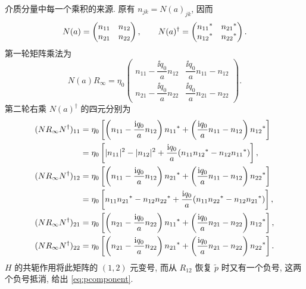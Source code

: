 \par\smallskip\noindent 介质分量中每一个乘积的来源.\quad
原有 $n_{jk}=N(a)_{jk}$, 因而
\begin{equation*}
N(a)=\begin{pmatrix}n_{11}&n_{12}\\n_{21}&n_{22}\end{pmatrix},\qquad
N(a)^\dagger=
\begin{pmatrix}{n_{11}}^{*}&{n_{21}}^{*}\\
{n_{12}}^{*}&{n_{22}}^{*}\end{pmatrix}.
\end{equation*}
第一轮矩阵乘法为
\begin{equation*}
N(a)R_\infty
=\eta_0\begin{pmatrix}
n_{11}-\dfrac{\ii q_0}{a}n_{12}
&\dfrac{\ii q_0}{a}n_{11}-n_{12}\\
n_{21}-\dfrac{\ii q_0}{a}n_{22}
&\dfrac{\ii q_0}{a}n_{21}-n_{22}
\end{pmatrix}.
\end{equation*}
第二轮右乘 $N(a)^\dagger$ 的四元分别为
\begin{equation*}
\begin{aligned}
(N R_\infty N^\dagger)_{11}
={}&\eta_0\left[
\left(n_{11}-\dfrac{\mathrm{i} q_0}{a}n_{12}\right){n_{11}}^{*}
+\left(\dfrac{\mathrm{i} q_0}{a}n_{11}-n_{12}\right){n_{12}}^{*}
\right]\\
={}&\eta_0\left[
|n_{11}|^2-|n_{12}|^2
+\dfrac{\mathrm{i} q_0}{a}
(n_{11}{n_{12}}^{*}-n_{12}{n_{11}}^{*})
\right],\\
(N R_\infty N^\dagger)_{12}
={}&\eta_0\left[
\left(n_{11}-\dfrac{\mathrm{i} q_0}{a}n_{12}\right){n_{21}}^{*}
+\left(\dfrac{\mathrm{i} q_0}{a}n_{11}-n_{12}\right){n_{22}}^{*}
\right]\\
={}&\eta_0\left[
n_{11}{n_{21}}^{*}-n_{12}{n_{22}}^{*}
+\dfrac{\mathrm{i} q_0}{a}
(n_{11}{n_{22}}^{*}-n_{12}{n_{21}}^{*})
\right],\\
(N R_\infty N^\dagger)_{21}
={}&\eta_0\left[
\left(n_{21}-\dfrac{\mathrm{i} q_0}{a}n_{22}\right){n_{11}}^{*}
+\left(\dfrac{\mathrm{i} q_0}{a}n_{21}-n_{22}\right){n_{12}}^{*}
\right],\\
(N R_\infty N^\dagger)_{22}
={}&\eta_0\left[
\left(n_{21}-\dfrac{\mathrm{i} q_0}{a}n_{22}\right){n_{21}}^{*}
+\left(\dfrac{\mathrm{i} q_0}{a}n_{21}-n_{22}\right){n_{22}}^{*}
\right].
\end{aligned}
\end{equation*}
$H$ 的共轭作用将此矩阵的 $(1,2)$ 元变号,
而从 $R_{12}$ 恢复 $\widetilde p$ 时又有一个负号,
这两个负号抵消, 给出 \eqref{eq:pcomponent}.
